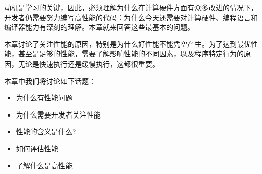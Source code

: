 动机是学习的关键，因此，必须理解为什么在计算硬件方面有众多改进的情况下，开发者仍需要努力编写高性能的代码：为什么今天还需要对计算硬件、编程语言和编译器能力有深刻的理解。本章就来回答这些最基本的问题。

本章讨论了关注性能的原因，特别是为什么好性能不能凭空产生。为了达到最优性能，甚至是足够的性能，需要了解影响性能的不同因素，以及程序特定行为的原因，无论是快速执行还是缓慢执行，这都很重要。

本章中我们将讨论如下话题：

\begin{itemize}
\item 为什么有性能问题
\item 为什么需要开发者关注性能
\item 性能的含义是什么?
\item 如何评估性能
\item 了解什么是高性能
\end{itemize}














